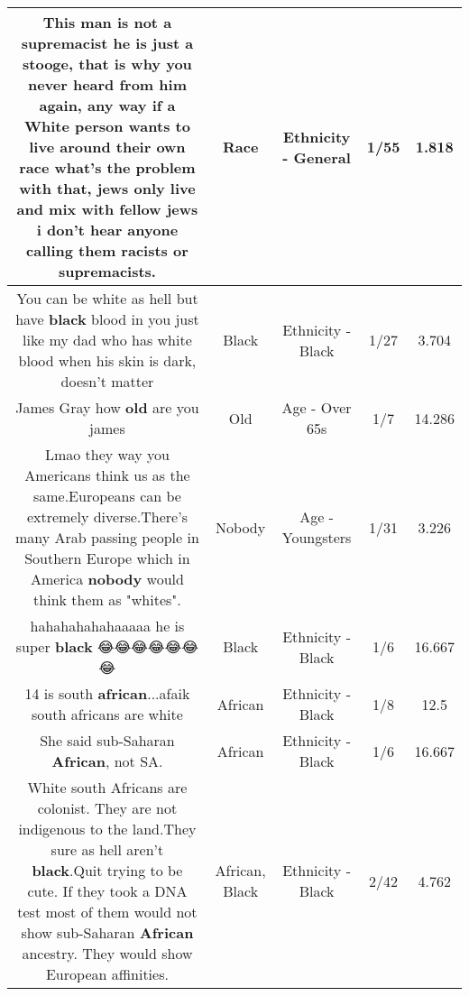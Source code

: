 \documentclass[11pt]{article}
\newlength\mylength
\begin{document}
\begin{center}
\begin{longtable}{|C{.65\mylength}|C{.30\mylength}|C{.12\mylength}|C{.12\mylength}|C{.12\mylength}|}
  \small This man is not a supremacist he is just a stooge, that is why you never heard from him again, any way if a White person wants to live around their own \textbf{race} what's the problem with that, jews only live and mix with fellow jews i don't hear anyone calling them racists or supremacists.\normalsize   & Race & Ethnicity - General & 1/55 & 1.818 \\  \hline
  \small You can be white as hell but have \textbf{black} blood in you just like my dad who has white blood when his skin is dark, doesn't matter\normalsize   & Black & Ethnicity - Black & 1/27 & 3.704 \\  \hline
  \small James Gray how \textbf{old} are you james\normalsize   & Old & Age - Over 65s & 1/7 & 14.286 \\  \hline
  \small {} Lmao they way you Americans think us as the same.Europeans can be extremely diverse.There's many Arab passing people in Southern Europe which in America \textbf{nobody} would think them as "whites".\normalsize   & Nobody & Age - Youngsters & 1/31 & 3.226 \\  \hline
  \small hahahahahahaaaaa he is super \textbf{black} 😂😂😂😂😂😂😂\normalsize   & Black & Ethnicity - Black & 1/6 & 16.667 \\  \hline
  \small 14 is south \textbf{african}...afaik south africans are white\normalsize   & African & Ethnicity - Black & 1/8 & 12.5 \\  \hline
  \small She said sub-Saharan \textbf{African}, not SA.\normalsize   & African & Ethnicity - Black & 1/6 & 16.667 \\  \hline
  \small White south Africans are colonist. They are not indigenous to the land.They sure as hell aren't \textbf{black}.Quit trying to be cute. If they took a DNA test most of them would not show sub-Saharan \textbf{African} ancestry. They would show European affinities.\normalsize   & African, Black & Ethnicity - Black & 2/42 & 4.762 \\  \hline

\end{longtable}
\end{center}
\end{document}
